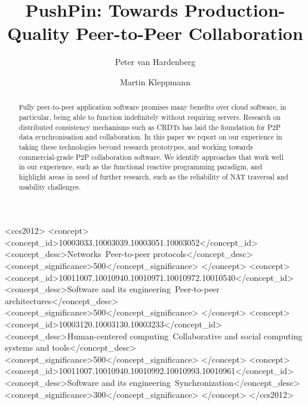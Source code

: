 \documentclass[sigplan,10pt]{acmart}
\begin{document}
\title{PushPin: Towards Production-Quality Peer-to-Peer Collaboration}

\author{Peter van Hardenberg}

\author{Martin Kleppmann}

\begin{abstract}
Fully peer-to-peer application software promises many benefits over cloud software, in particular, being able to function indefinitely without requiring servers.
Research on distributed consistency mechanisms such as CRDTs has laid the foundation for P2P data synchronisation and collaboration.
In this paper we report on our experience in taking these technologies beyond research prototypes, and working towards commercial-grade P2P collaboration software.
We identify approaches that work well in our experience, such as the functional reactive programming paradigm, and highlight areas in need of further research, such as the reliability of NAT traversal and usability challenges.
\end{abstract}

\begin{CCSXML}
<ccs2012>
    <concept>
        <concept_id>10003033.10003039.10003051.10003052</concept_id>
        <concept_desc>Networks~Peer-to-peer protocols</concept_desc>
        <concept_significance>500</concept_significance>
    </concept>
    <concept>
        <concept_id>10011007.10010940.10010971.10010972.10010540</concept_id>
        <concept_desc>Software and its engineering~Peer-to-peer architectures</concept_desc>
        <concept_significance>500</concept_significance>
    </concept>
    <concept>
        <concept_id>10003120.10003130.10003233</concept_id>
        <concept_desc>Human-centered computing~Collaborative and social computing systems and tools</concept_desc>
        <concept_significance>500</concept_significance>
    </concept>
    <concept>
        <concept_id>10011007.10010940.10010992.10010993.10010961</concept_id>
        <concept_desc>Software and its engineering~Synchronization</concept_desc>
        <concept_significance>300</concept_significance>
    </concept>
</ccs2012>
\end{CCSXML}
\end{document}
